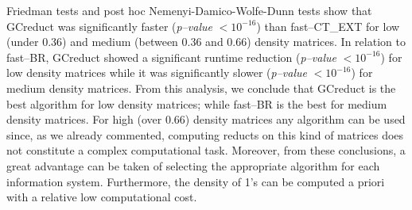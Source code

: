 \documentclass[number,preprint,review,12pt]{elsarticle}
\begin{document}
	Friedman tests and post hoc Nemenyi-Damico-Wolfe-Dunn tests show that GCreduct was significantly faster (\textit{p--value} $< 10^{-16}$) than fast--CT\_EXT for low (under 0.36) and medium (between 0.36 and 0.66) density matrices. In relation to fast--BR, GCreduct showed a significant runtime reduction (\textit{p--value} $< 10^{-16}$) for low density matrices while it was significantly slower (\textit{p--value} $< 10^{-16}$) for medium density matrices. From this analysis, we conclude that GCreduct is the best algorithm for low density matrices; while fast--BR is the best for medium density matrices. For high (over 0.66) density matrices any algorithm can be used since, as we already commented, computing reducts on this kind of matrices does not constitute a complex computational task. Moreover, from these conclusions, a great advantage can be taken of selecting the appropriate algorithm for each information system. Furthermore, the density of 1's can be computed a priori with a relative low computational cost.
		
\end{document}
